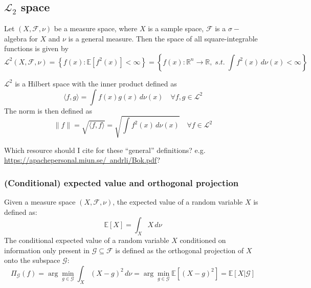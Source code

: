 \subsection{$\mathcal{L}_2$ space}
Let $(X, \mathcal{F}, \nu)$ be a measure space, where $X$ is a sample space, $\mathcal{F}$ is a $\sigma-$algebra for $X$ and $\nu$ is a general measure. Then the space of all square-integrable functions is given by
\[
\mathcal{L}^2(X, \mathcal{F}, \nu) = \left\{ f(x) : \mathbb{E}[f^2(x)] < \infty \right\}
= \left\{ f(x) : \mathbb{R}^{n} \to \mathbb{R}, \; \textit{s.t.} \; \int f^2(x)\, d\nu(x) < \infty \right\}
\]

$\mathcal{L}^2$ is a Hilbert space with the inner product defined as
\[
\langle f, g \rangle = \int f(x) g(x) \, d\nu(x) \quad \forall f, g \in \mathcal{L}^2
\]
The norm is then defined as
\[
\|f\| = \sqrt{\langle f, f \rangle} = \sqrt{\int f^2(x) \, d\nu(x)} \quad \forall f \in \mathcal{L}^2
\]

{\color{blue} Which resource should I cite for these ``general'' definitions? e.g. \href{https://apachepersonal.miun.se/~andrli/Bok.pdf}{https://apachepersonal.miun.se/~andrli/Bok.pdf}?}

\subsubsection*{(Conditional) expected value and orthogonal projection}
Given a measure space $(X, \mathcal{F}, \nu)$, the expected value of a random variable $X$ is defined as:
\[
\mathbb{E}[X] = \int_X X \, d\nu
\]
The conditional expected value of a random variable $X$ conditioned on information only present in $\mathcal{G} \subseteq \mathcal{F}$ is defined as the orthogonal projection of $X$ onto the subspace $\mathcal{G}$:
\[
\Pi_{\mathcal{G}}(f) = \arg\min_{g \in \mathcal{G}} \int_X (X - g)^2 \, d\nu
= \arg\min_{g \in \mathcal{G}} \mathbb{E}[(X - g)^2] = \mathbb{E}[X | \mathcal{G}]
\]

